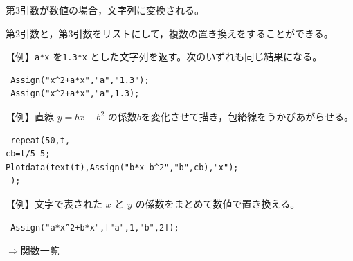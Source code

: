 \documentclass[papersize,a4paper,10pt,uplatex]{jsarticle}
\begin{document}
\begin{description}
第3引数が数値の場合，文字列に変換される。

第2引数と，第3引数をリストにして，複数の置き換えをすることができる。

\vspace{\baselineskip}
【例】\verb|a*x| を\verb|1.3*x| とした文字列を返す。次のいずれも同じ結果になる。
\begin{verbatim}
 Assign("x^2+a*x","a","1.3"); 
 Assign("x^2+a*x","a",1.3);
\end{verbatim}

\vspace{\baselineskip}
【例】直線 $y=bx-b^2$ の係数$b$を変化させて描き，包絡線をうかびあがらせる。
\begin{verbatim}
 repeat(50,t,
cb=t/5-5;
Plotdata(text(t),Assign("b*x-b^2","b",cb),"x");
 );
\end{verbatim}
\begin{center}  \end{center}
\vspace{\baselineskip}
【例】文字で表された $x$ と $y$ の係数をまとめて数値で置き換える。
\begin{verbatim} 
 Assign("a*x^2+b*x",["a",1,"b",2]);
\end{verbatim}

\begin{flushright}\hyperlink{functionlist}{$\Rightarrow$関数一覧}\end{flushright}

\end{description}
\end{document}

